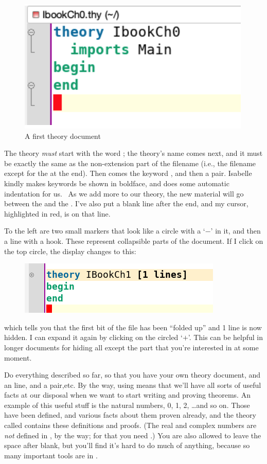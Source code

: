 \begin{figure}[h]
    \centering
    \includegraphics[width=0.5\linewidth]{C01//Images/first-theory.png}
    \caption{A first theory document}
    \label{fig:first-theory-doc}
\end{figure}
The theory \textit{must} start with the word ; the theory's name comes next, and it must be exactly the same as the non-extension part of the filename (i.e., the filename except for the  at the end). Then comes the keyword , and then a  pair. Isabelle kindly makes keywords be shown in boldface, and does some automatic indentation for us.  As we add more to our theory, the new material will go between the  and the . I've also put a blank line after the end, and my cursor, highlighted in red, is on that line. 

To the left are two small markers that look like a circle with a `$-$' in it, and then a line with a hook. These represent collapsible parts of the document. If I click on the top circle, the display changes to this:
\begin{figure}[h]
    \centering
    \includegraphics[width=0.5\linewidth]{C01//Images/folded-theory.png}
\end{figure}
\noindent which tells you that the first bit of the file has been ``folded up'' and 1 line is now hidden. I can expand it again by clicking on the circled `$+$'. This can be helpful in longer documents for hiding all except the part that you're interested in at some moment. 

\task
Do everything described so far, so that you have your own theory document, and an  line, and a  pair,etc.
\etask
By the way, using  means that we'll have all sorts of useful facts at our disposal when we want to start writing and proving theorems. An example of this useful stuff is the natural numbers, 0, 1, 2, \ldots  and so on. Those have been defined, and various facts about them proven already, and the theory called  contains these definitions and proofs. (The real and complex numbers are \textit{not} defined in , by the way; for that you need .) You are also allowed to  leave the space after  blank, but you'll find it's hard to do much of anything, because so many important tools are in .


